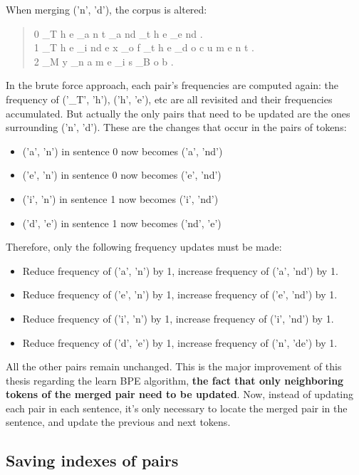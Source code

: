 When merging ('n', 'd'), the corpus is altered:

\begin{quote}
	0	\_T h e \_a n t \_a nd \_t h e \_e nd .\\
	1 	\_T h e \_i nd e x \_o f \_t h e \_d o c u m e n t .\\
	2 	\_M y \_n a m e \_i s \_B o b .
\end{quote}

In the brute force approach, each pair's frequencies are computed again: the frequency of ('\_T', 'h'), ('h', 'e'), etc are all revisited and their frequencies accumulated. But actually the only pairs that need to be updated are the ones surrounding ('n', 'd'). These are the changes that occur in the pairs of tokens:

\begin{itemize}
	\item ('a', 'n') in sentence 0 now becomes ('a', 'nd')
	\item ('e', 'n') in sentence 0 now becomes ('e', 'nd')
	\item ('i', 'n') in sentence 1 now becomes ('i', 'nd')
	\item ('d', 'e') in sentence 1 now becomes ('nd', 'e')
\end{itemize}

Therefore, only the following frequency updates must be made:

\begin{itemize}
	\item Reduce frequency of ('a', 'n') by 1, increase frequency of ('a', 'nd') by 1.
	\item Reduce frequency of ('e', 'n') by 1, increase frequency of ('e', 'nd') by 1.
	\item Reduce frequency of ('i', 'n') by 1, increase frequency of ('i', 'nd') by 1.
	\item Reduce frequency of ('d', 'e') by 1, increase frequency of ('n', 'de') by 1.
\end{itemize}

All the other pairs remain unchanged. This is the major improvement of this thesis regarding the learn BPE algorithm, \textbf{the fact that only neighboring tokens of the merged pair need to be updated}. Now, instead of updating each pair in each sentence, it's only necessary to locate the merged pair in the sentence, and update the previous and next tokens.

\subsection{Saving indexes of pairs}

